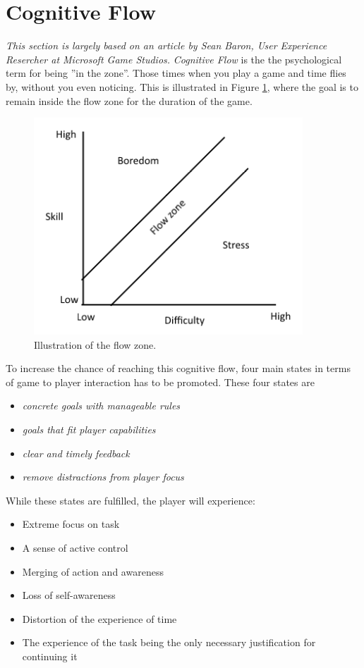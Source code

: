 \section{Cognitive Flow}\label{gamedesign:cognitiveflow}
\emph{This section is largely based on an article by Sean Baron, User Experience Resercher at Microsoft Game
Studios\cite{baron}.}
\emph{Cognitive Flow} is the the psychological term for being ''in the zone''. Those times when you play a game and
time flies by, without you even noticing.  This is illustrated in Figure \ref{gamedesign:flowzone}, where the goal is
to remain inside the flow zone for the duration of the game.
\begin{figure}
    \includegraphics{figures/gamedesign/flowZone}
    \caption{Illustration of the flow zone.}
    \label{gamedesign:flowzone}
\end{figure}

To increase the chance of reaching this cognitive flow, four main states in terms of game to player interaction has to
be promoted.  These four states are 
\begin{itemize}
    \item \emph{concrete goals with manageable rules}
    \item \emph{goals that fit player capabilities}
    \item \emph{clear and timely feedback}
    \item \emph{remove distractions from player focus}
\end{itemize} While these states are fulfilled, the player will experience:

\begin{itemize}
    \item Extreme focus on task
    \item A sense of active control
    \item Merging of action and awareness
    \item Loss of self-awareness
    \item Distortion of the experience of time
    \item The experience of the task being the only necessary justification for continuing it
\end{itemize}

